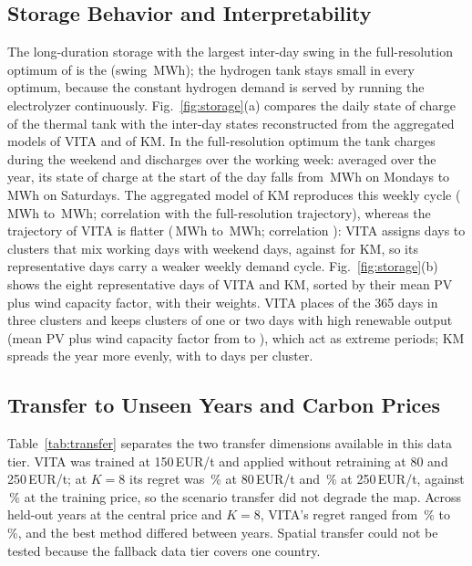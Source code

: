 \documentclass[journal]{IEEEtran}
\begin{document}
\subsection{Storage Behavior and Interpretability}
The long-duration storage with the largest inter-day swing in the full-resolution optimum of \FigFiveYear{} is the \FigFiveStorage{} (swing \FigFiveSwing\,MWh); the hydrogen tank stays small in every optimum, because the constant hydrogen demand is served by running the electrolyzer continuously. Fig.~\ref{fig:storage}(a) compares the daily state of charge of the thermal tank with the inter-day states reconstructed from the aggregated models of VITA and of KM. In the full-resolution optimum the tank charges during the weekend and discharges over the working week: averaged over the year, its state of charge at the start of the day falls from \SOCFullMon\,MWh on Mondays to \SOCFullSat\,MWh on Saturdays. The aggregated model of KM reproduces this weekly cycle (\SOCBaseMon\,MWh to \SOCBaseSat\,MWh; correlation \CorrSOCBase{} with the full-resolution trajectory), whereas the trajectory of VITA is flatter (\SOCVITAMon\,MWh to \SOCVITASat\,MWh; correlation \CorrSOCVITA): VITA assigns \NDaysMixedVITA{} days to clusters that mix working days with weekend days, against \NDaysMixedKM{} for KM, so its representative days carry a weaker weekly demand cycle. Fig.~\ref{fig:storage}(b) shows the eight representative days of VITA and KM, sorted by their mean PV plus wind capacity factor, with their weights. VITA places \WVitaTopThree{} of the 365 days in three clusters and keeps \NVitaSmall{} clusters of one or two days with high renewable output (mean PV plus wind capacity factor from \CFVitaSmallMin{} to \CFVitaSmallMax), which act as extreme periods; KM spreads the year more evenly, with \WKMMin{} to \WKMMax{} days per cluster.



\subsection{Transfer to Unseen Years and Carbon Prices}
Table~\ref{tab:transfer} separates the two transfer dimensions available in this data tier. VITA was trained at 150\,EUR/t and applied without retraining at 80 and 250\,EUR/t; at $K=8$ its regret was \RegVITAKeightEighty\,\% at 80\,EUR/t and \RegVITAKeightTwoFifty\,\% at 250\,EUR/t, against \RegVITAKeightOneFifty\,\% at the training price, so the scenario transfer did not degrade the map. Across held-out years at the central price and $K=8$, VITA's regret ranged from \VITAYearMinKeight\,\% to \VITAYearMaxKeight\,\%, and the best method differed between years. Spatial transfer could not be tested because the fallback data tier covers one country.
\end{document}
